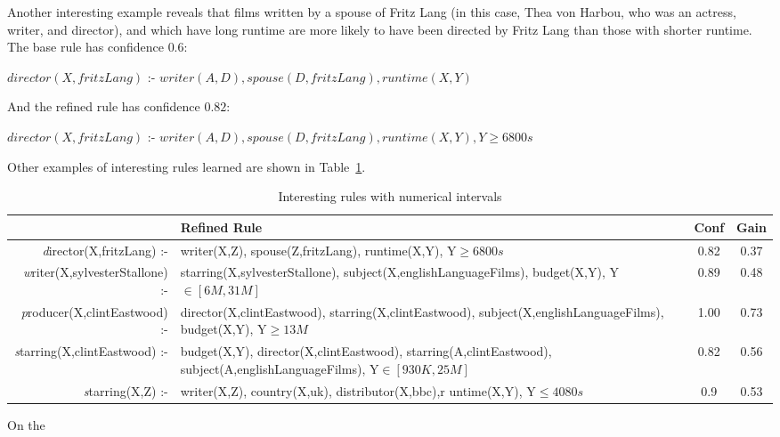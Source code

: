 Another interesting example reveals that films written by a spouse of Fritz Lang (in this case, Thea von
Harbou, who was an actress, writer, and director), and which have long runtime are more likely to have been directed by
Fritz Lang than those with shorter runtime. The base rule has confidence $0.6$:

$director(X,fritzLang)$ :- $writer(A,D),spouse(D,fritzLang),runtime(X,Y)$

And the refined rule has confidence $0.82$:

$director(X,fritzLang)$ :- $writer(A,D),spouse(D,fritzLang),runtime(X,Y),Y\geq 6800s$

Other examples of interesting rules learned are shown in Table~\ref{tab:mdbRuleExamples}.

\begin{table}[h!]
\begin{minipage}{\textwidth}
 \begin{center}
 \caption{Interesting rules with numerical intervals}
  \begin{tabular}{ >{\emph}r >{\raggedright}p{7cm} | c | c }
    \toprule
      & Refined Rule				& Conf 	& Gain \\
    \midrule
      director(X,fritzLang) :-&writer(X,Z), spouse(Z,fritzLang), runtime(X,Y), Y$\geq 6800s$ & 
      0.82	& 0.37 \\
      writer(X,sylvesterStallone) :-&starring(X,sylvesterStallone), subject(X,englishLanguageFilms),
      budget(X,Y), Y$\in [6M,31M]$ &
      0.89	& 0.48 \\
      producer(X,clintEastwood) :-&director(X,clintEastwood), starring(X,clintEastwood),
      subject(X,englishLanguageFilms), budget(X,Y), Y$\geq 13M$ &
      1.00	& 0.73 \\
      starring(X,clintEastwood) :- &budget(X,Y), director(X,clintEastwood), starring(A,clintEastwood), 
      subject(A,englishLanguageFilms), Y$\in [930K,25M]$&
      0.82	& 0.56 \\
      starring(X,Z) :-&writer(X,Z), country(X,uk), distributor(X,bbc),r untime(X,Y), Y$\leq 4080s$ &
      0.9	& 0.53 \\

    \bottomrule
  \end{tabular}
 \label{tab:mdbRuleExamples}
 \end{center}
\end{minipage}
\end{table}


On the

